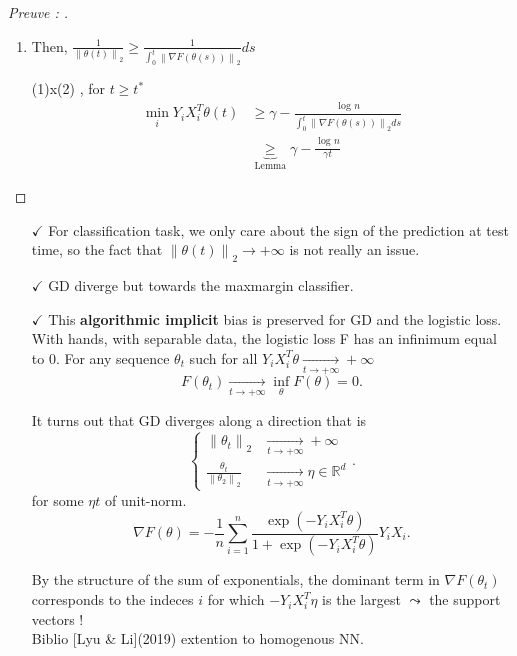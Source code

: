 \begin{proof}[Preuve : ]
\begin{enumerate}
        \item Then, $\frac{1}{\left\| \theta  (t) \right\|_2 } \geq \frac{1}{\int_{0}^{t} \left\| \nabla F(\theta (s)) \right\|_2 } ds$
        
        \item [(1)x(2)], for $t \geq t^\ast $
            \begin{align*}
                \min _i Y_iX_i^T \theta (t) &\geq \gamma - \frac{\log_{}n }{\int_{0}^{t} \left\| \nabla F(\theta (s)) \right\|_2 ds} \\
                & \underbrace{\geq }_{\text{Lemma}} \gamma - \frac{\log_{}n }{\gamma t}
            \end{align*}
    \end{enumerate}
\end{proof}
\begin{itemize}
    \item [$ \checkmark $] For classification task, we only care about the sign of the prediction at test time, so the fact that $ \left\| \theta (t) \right\| _2 \to +\infty  $ is not really an issue.
    \item [$ \checkmark $] GD diverge but towards the maxmargin classifier. 
    \item [$ \checkmark $] This \textbf{algorithmic implicit} bias is preserved for GD and the logistic loss. With hands, with separable data, the logistic loss F has an infinimum equal to 0. For any sequence $\theta _t $ such for all $ Y_i X_i^T \theta \xrightarrow[t \to +\infty]{} + \infty $
    \[
        F(\theta _t) \xrightarrow[t \to +\infty]{} \inf _{\theta } F(\theta )=0
    .\]
    

    It turns out that GD diverges along a direction that is 
    \[
        \begin{cases}
            \left\| \theta _t \right\| _2 &\xrightarrow[t \to +\infty]{} + \infty \\
            \frac{\theta _t}{\left\| \theta _2 \right\| _2} &\xrightarrow[t \to +\infty]{} \eta \in \mathbb{R}^d
        \end{cases} 
    .\]
    for some $ \eta t $ of unit-norm.
    \[
        \nabla F(\theta ) = - \frac{1}{n} \sum_{i=1}^{n} \frac{\exp (-Y_i X_i^T \theta )}{1 + \exp (-Y_i X_i ^T \theta )}Y_i X_i
    .\]
    
    By the structure of the sum of exponentials, the dominant term in $\nabla F(\theta _t)$ corresponds to the indeces $i$ for which $-Y_iX_i^T \eta $ is the largest $\leadsto$ the support vectors ! \\
    Biblio [Lyu \& Li](2019) extention to homogenous NN. 
    
\end{itemize}

